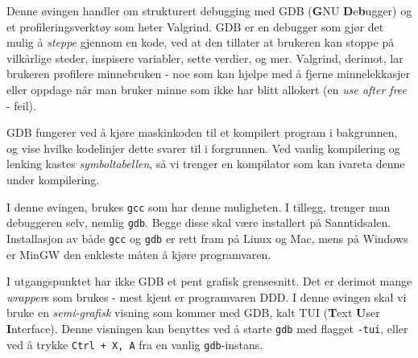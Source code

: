 \begin{alphasection}
Denne øvingen handler om strukturert debugging med GDB (\textbf{G}NU \textbf{D}e\textbf{b}ugger) og et profileringsverktøy som heter Valgrind. GDB er en debugger som gjør det mulig å \textit{steppe} gjennom en kode, ved at den tillater at brukeren kan stoppe på vilkårlige steder, inspisere variabler, sette verdier, og mer. Valgrind, derimot, lar brukeren profilere minnebruken - noe som kan hjelpe med å fjerne minnelekkasjer eller oppdage når man bruker minne som ikke har blitt allokert (en \textit{use after free} - feil).


GDB fungerer ved å kjøre maskinkoden til et kompilert program i bakgrunnen, og vise hvilke kodelinjer dette svarer til i forgrunnen. Ved vanlig kompilering og lenking kastes \textit{symboltabellen}, så vi trenger en kompilator som kan ivareta denne under kompilering.

I denne øvingen, brukes \verb|gcc| som har denne muligheten. I tillegg, trenger man debuggeren selv, nemlig \verb|gdb|. Begge disse skal være installert på Sanntidsalen. Installasjon av både \verb|gcc| og \verb|gdb| er rett fram på Linux og Mac, mens på Windows er MinGW den enkleste måten å kjøre programvaren.

I utgangspunktet har ikke GDB et pent grafisk grensesnitt. Det er derimot mange \textit{wrapper}s som brukes - mest kjent er programvaren DDD. I denne øvingen skal vi bruke en \textit{semi-grafisk} visning som kommer med GDB, kalt TUI (\textbf{T}ext \textbf{U}ser \textbf{I}nterface). Denne visningen kan benyttes ved å starte \verb|gdb| med flagget \verb|-tui|, eller ved å trykke \verb|Ctrl + X, A| fra en vanlig \verb|gdb|-instans.

\end{alphasection}

\setcounter{section}{0}